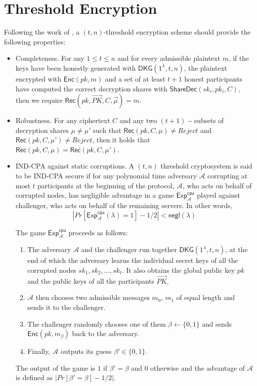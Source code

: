 \documentclass[letterpaper,twocolumn,10pt]{article}
\theoremstyle{definition}
\theoremstyle{remark}
\begin{document}
\section{Threshold Encryption}
\label{appendix:thresholdEnc}
Following the work of \cite{cortier2013distributed}, a $(t, n)$-threshold encryption scheme should provide the following properties:
\begin{itemize}
    \item Completeness. For any $1\le t\le n$ and for every admissible plaintext $m$, if the keys have been honestly generated with $\mathsf{DKG}(1^\lambda, t, n)$, the plaintext encrypted with $\mathsf{Enc}(pk, m)$ and a set of at least $t+1$ honest participants have computed the correct decryption shares with $\mathsf{ShareDec}(sk_i, pk_i, C)$, then we require $\mathsf{Rec}(pk, \vec{PK}, C, \vec{\mu} ) = m$.
    \item Robustness. For any ciphertext $C$ and any two $(t+1)-$subsets of decryption shares $\mu \ne \mu'$ such that $\mathsf{Rec}(pk, C, \mu) \ne {Reject}$ and $\mathsf{Rec}(pk, C, \mu') \ne {Reject}$, then it holds that $\mathsf{Rec}(pk, C, \mu) = \mathsf{Rec}(pk, C, \mu')$.
    \item IND-CPA against static corruptions. A $(t, n)$ threshold cryptosystem is said to be IND-CPA secure if for any polynomial time adversary $\mathcal{A}$ corrupting at most $t$ participants at the beginning of the protocol, $\mathcal{A}$, who acts on behalf of corrupted nodes, has negligible advantage in a  game $\mathsf{Exp}^{\mathsf{cpa}}_{\mathcal{A}}$ played against challenger, who acts on behalf of the remaining servers. In other words,
    $$|Pr[\mathsf{Exp}_{\mathcal{A}}^{\mathsf{cpa}}(\lambda) = 1] - 1/2| < \mathsf{negl}(\lambda)$$
    
    The game $\mathsf{Exp}^{\mathsf{cpa}}_{\mathcal{A}}$ proceeds as follows:
    \begin{enumerate}
        \item The adversary $\mathcal{A}$ and the challenger run together $\mathsf{DKG}(1^\lambda, t, n)$, at the end of which the adversary learns the individual secret keys of all the corrupted nodes $sk_1, sk_2, \ldots, sk_t$. It also obtains the global public key $pk$ and the public keys of all the participants $\vec{PK}$.
        \item $\mathcal{A}$ then chooses two admissible messages $m_0$, $m_1$ of equal length and sends it to the challenger.
        \item The challenger randomly chooses one of them $\beta \leftarrow \{0, 1\}$ and sends $\mathsf{Enc}(pk, m_{\beta})$ back to the adversary.
        \item Finally, $\mathcal{A}$ outputs its guess $\beta' \in \{0,1\}$.
    \end{enumerate}
    The output of the game is $1$ if $\beta' = \beta$ and $0$ otherwise and the advantage of $\mathcal{A}$ is defined as $|Pr[\beta' = \beta] - 1/2|$.
\end{itemize}
\end{document}
